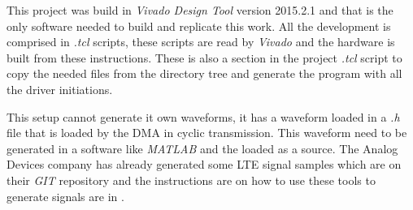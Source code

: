  This project was build in \emph{Vivado Design Tool} version 2015.2.1
\cite{xilinx:vivado} and that is the only software needed to build and
replicate this work. All the development is comprised in \emph{.tcl} scripts,
these scripts are read by \emph{Vivado} and the hardware is built from these
instructions. These is also a section in the project \emph{.tcl} script to copy
the needed files from the directory tree and generate the program with all the
driver initiations.

This setup cannot generate it own waveforms, it has a waveform loaded in a
\emph{.h} file that is loaded by the DMA in cyclic transmission. This waveform
need to be generated in a software like \emph{MATLAB} and the loaded as a
source. The Analog Devices company has already generated some LTE signal samples
which are on their \emph{GIT} repository \cite{web:gitanalogdevlte} and the
instructions are on how to use these tools to generate signals are in
\cite{web:analogmatlabwiki}.
%
%
%
